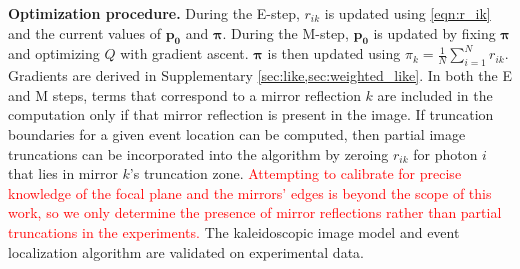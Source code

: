 \noindent
\textbf{Optimization procedure.}
During the E-step, $r_{ik}$ is updated using \cref{eqn:r_ik} and the current 
values of $\bm{p_0}$ and $\bm{\pi}$.
During the M-step, $\bm{p_0}$ is updated by fixing $\bm{\pi}$ and optimizing 
$Q$ with gradient ascent. 
$\bm{\pi}$ is then updated using $\pi_k=\frac{1}{N}\sum_{i=1}^N r_{ik}$.
Gradients are derived in Supplementary \cref*{sec:like,sec:weighted_like}.
In both the E and M steps, terms that correspond to a mirror reflection $k$ are 
included in the computation only if that mirror reflection is present in the image.
If truncation boundaries for a given event location can be computed, then partial 
image truncations can be incorporated into the algorithm by zeroing $r_{ik}$ for 
photon $i$ that lies in mirror $k$'s truncation zone.
\textcolor{red}{Attempting to calibrate for precise knowledge of the focal plane and the mirrors' 
edges is beyond the scope of this work,
so we only determine the presence of mirror reflections rather than partial 
truncations in the experiments.}
The kaleidoscopic image model and event localization algorithm are validated on 
experimental data.
